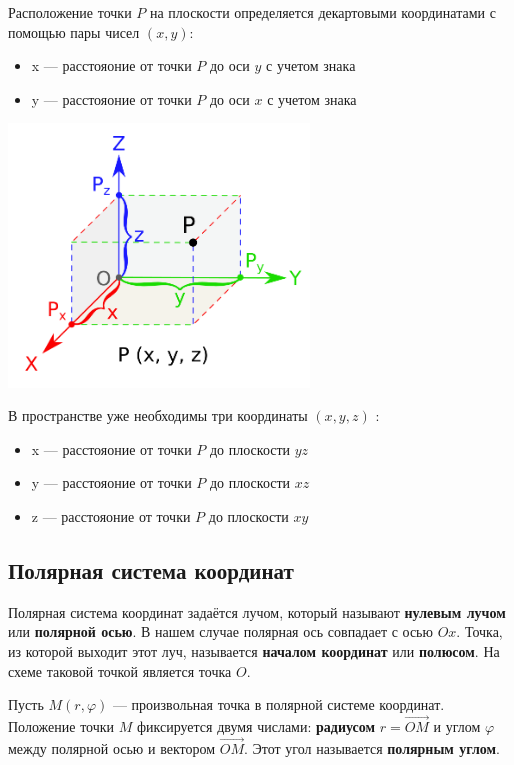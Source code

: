 \documentclass[a4paper,12pt]{extbook}
\theoremstyle{named}
\theoremstyle{named}
\begin{document}
Расположение точки \(P\) на плоскости определяется декартовыми координатами с помощью пары чисел \((x, y)\):
\begin{itemize}
    \item {x — расстояоние от точки \(P\) до оси \(y\) с учетом знака}
    \item {y — расстояоние от точки \(P\) до оси \(x\) с учетом знака}
\end{itemize}

\begin{center}
    \includegraphics[width=0.6\textwidth]{cartesian_system.png}
\end{center}

В пространстве уже необходимы три координаты \((x, y, z)\) :
\begin{itemize}
    \item {x — расстояоние от точки \(P\) до плоскости \(yz\)}
    \item {y — расстояоние от точки \(P\) до плоскости \(xz\)}
    \item {z — расстояоние от точки \(P\) до плоскости \(xy\)}
\end{itemize}

\subsection*{Полярная система координат}
Полярная система координат задаётся лучом, который называют \textbf{нулевым лучом} или \textbf{полярной осью}.
В нашем случае полярная ось совпадает с осью \(Ox\).
Точка, из которой выходит этот луч, называется \textbf{началом координат} или \textbf{полюсом}.
На схеме таковой точкой является точка \(O\).

Пусть \(M (r, \varphi)\) — произвольная точка в полярной системе координат.
Положение точки \(M\) фиксируется двумя числами: \textbf{радиусом} \(r = \overrightarrow{OM}\) и углом \(\varphi\) между полярной осью и вектором \(\overrightarrow{OM}\).
Этот угол называется \textbf{полярным углом}.
\end{document}
